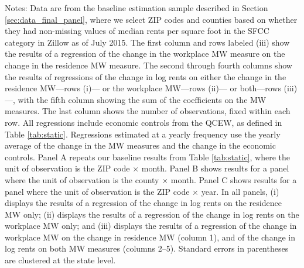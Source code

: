 \begin{landscape}
\begin{table}[ht!]
    \begin{minipage}{.95\linewidth} \footnotesize
        \vspace{2mm}
        Notes:
        Data are from the baseline estimation sample described in Section 
        \ref{sec:data_final_panel}, where we select ZIP codes and counties based 
        on whether they had non-missing values of median rents per square foot 
        in the SFCC category in Zillow as of July 2015.
        The first column and rows labeled (iii) show the results of a regression 
        of the change in the workplace MW measure on the change in the 
        residence MW measure.
        The second through fourth columns show the results of regressions of the 
        change in log rents on either the change in the residence MW---rows (i)---
        or the workplace MW---rows (ii)--- 
        or both---rows (iii)---, with the fifth column showing the sum of the 
        coefficients on the MW measures.
        The last column shows the number of observations, fixed within each row.
        All regressions include economic controls from the QCEW, as defined in
        Table \ref{tab:static}.
        Regressions estimated at a yearly frequency use the yearly average of
        the change in the MW measures and the change in the economic controls.
        Panel A repeats our baseline results from Table \ref{tab:static}, where 
        the unit of observation is the ZIP code $\times$ month.
        Panel B shows results for a panel where the unit of observation is the 
        county $\times$ month.
        Panel C shows results for a panel where the unit of observation is the 
        ZIP code $\times$ year.
        In all panels,
        (i) displays the results of a regression of the change in log rents on 
        the residence MW only;
        (ii) displays the results of a regression of the change in log 
        rents on the workplace MW only; and
        (iii) displays the results of a regression of the change in workplace
        MW on the change in residence MW (column 1), and of the change in 
        log rents on both MW measures (columns 2--5).
        Standard errors in parentheses are clustered at the state level.
    \end{minipage}
\end{table}
\end{landscape}
